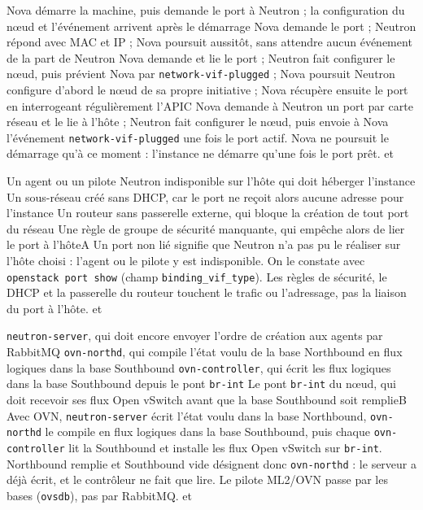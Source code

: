   {Nova démarre la machine, puis demande le port à Neutron ; la configuration du nœud et l'événement arrivent après le démarrage}
  {Nova demande le port ; Neutron répond avec MAC et IP ; Nova poursuit aussitôt, sans attendre aucun événement de la part de Neutron}
  {Nova demande et lie le port ; Neutron fait configurer le nœud, puis prévient Nova par \texttt{network-vif-plugged} ; Nova poursuit}
  {Neutron configure d'abord le nœud de sa propre initiative ; Nova récupère ensuite le port en interrogeant régulièrement l'API}{C}
  {Nova demande à Neutron un port par carte réseau et le lie à l'hôte ; Neutron fait configurer le nœud, puis envoie à Nova l'événement \texttt{network-vif-plugged} une fois le port actif. Nova ne poursuit le démarrage qu'à ce moment : l'instance ne démarre qu'une fois le port prêt.}
  { et }

  {Un agent ou un pilote Neutron indisponible sur l'hôte qui doit héberger l'instance}
  {Un sous-réseau créé sans DHCP, car le port ne reçoit alors aucune adresse pour l'instance}
  {Un routeur sans passerelle externe, qui bloque la création de tout port du réseau}
  {Une règle de groupe de sécurité manquante, qui empêche alors de lier le port à l'hôte}{A}
  {Un port non lié signifie que Neutron n'a pas pu le réaliser sur l'hôte choisi : l'agent ou le pilote y est indisponible. On le constate avec \texttt{openstack port show} (champ \texttt{binding\_vif\_type}). Les règles de sécurité, le DHCP et la passerelle du routeur touchent le trafic ou l'adressage, pas la liaison du port à l'hôte.}
  { et }

  {\texttt{neutron-server}, qui doit encore envoyer l'ordre de création aux agents par RabbitMQ}
  {\texttt{ovn-northd}, qui compile l'état voulu de la base Northbound en flux logiques dans la base Southbound}
  {\texttt{ovn-controller}, qui écrit les flux logiques dans la base Southbound depuis le pont \texttt{br-int}}
  {Le pont \texttt{br-int} du nœud, qui doit recevoir ses flux Open vSwitch avant que la base Southbound soit remplie}{B}
  {Avec OVN, \texttt{neutron-server} écrit l'état voulu dans la base Northbound, \texttt{ovn-northd} le compile en flux logiques dans la base Southbound, puis chaque \texttt{ovn-controller} lit la Southbound et installe les flux Open vSwitch sur \texttt{br-int}. Northbound remplie et Southbound vide désignent donc \texttt{ovn-northd} : le serveur a déjà écrit, et le contrôleur ne fait que lire. Le pilote ML2/OVN passe par les bases (\texttt{ovsdb}), pas par RabbitMQ.}
  { et }

